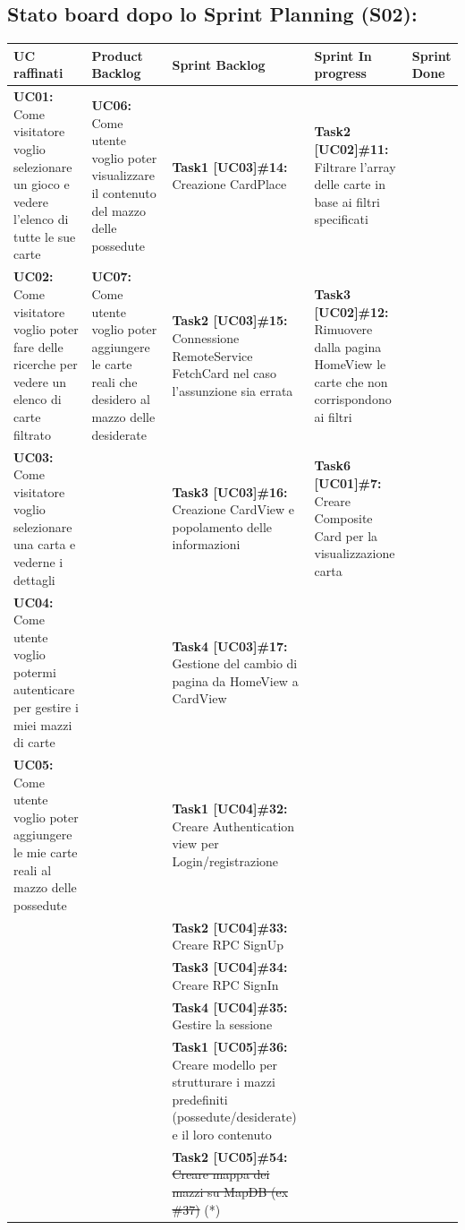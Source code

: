 \documentclass[a4paper, oneside]{article}
\begin{document}
\begin{landscape}
        \newpage
        \subsection{Stato board dopo lo Sprint Planning (S02):}
        \small
        \def\arraystretch{2}%
        \begin{tabular}{ | p{6cm} | p{3.2cm} | p{7.8cm} | p{3.6cm} | p{2.2cm}| }
            \hline
            \textbf{UC raffinati}
            & \textbf{Product Backlog}
            & \textbf{Sprint Backlog}
            & \textbf{Sprint In progress}
            & \textbf{Sprint Done} \\
            \hline
            \hline
            \textbf{UC01:} Come visitatore voglio selezionare un gioco e vedere l'elenco di tutte le sue carte & \textbf{UC06:} Come utente voglio poter visualizzare il contenuto del mazzo delle possedute & \textbf{Task1 [UC03]\#14:} Creazione CardPlace & \textbf{Task2 [UC02]\#11:} Filtrare l'array delle carte in base ai filtri specificati   & \\
            \hline
            \textbf{UC02:} Come visitatore voglio poter fare delle ricerche per vedere un elenco di carte filtrato &  \textbf{UC07:} Come utente voglio poter aggiungere le carte reali che desidero al mazzo delle desiderate  & \textbf{Task2 [UC03]\#15:} Connessione RemoteService FetchCard nel caso l'assunzione sia errata &  \textbf{Task3 [UC02]\#12:} Rimuovere dalla pagina HomeView le carte che non corrispondono ai filtri & \\
            \hline
            \textbf{UC03:}  Come visitatore voglio selezionare una carta e vederne i dettagli &  & \textbf{Task3 [UC03]\#16:} Creazione CardView e popolamento delle informazioni  & \textbf{Task6 [UC01]\#7:}  Creare Composite Card per la visualizzazione carta &\\
            \hline
            \textbf{UC04:}  Come utente voglio potermi autenticare per gestire i miei mazzi di carte & & \textbf{Task4 [UC03]\#17:} Gestione del cambio di pagina da HomeView a CardView & & \\
            \hline
            \textbf{UC05:}  Come utente voglio poter aggiungere le mie carte reali al mazzo delle possedute & & \textbf{Task1 [UC04]\#32:} Creare Authentication view per Login/registrazione  & & \\
            \hline
            & & \textbf{Task2 [UC04]\#33:} Creare RPC SignUp & & \\
            \hline
            & & \textbf{Task3 [UC04]\#34:} Creare RPC SignIn  & & \\
            \hline
            & & \textbf{Task4 [UC04]\#35:} Gestire la sessione  & & \\
            \hline
            & & \textbf{Task1 [UC05]\#36:} Creare modello per strutturare i mazzi predefiniti (possedute/desiderate) e il loro contenuto  & & \\
            \hline
            & & \textbf{Task2 [UC05]\#54:} \st{Creare mappa dei mazzi su MapDB (ex \#37)} (*) & & \\


\end{tabular}
\end{landscape}
\end{document}
